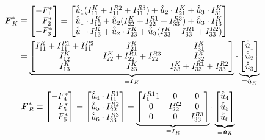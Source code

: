 \begin{equation}
\begin{split}
\boldsymbol{F}^*_K &\equiv \begin{bmatrix}-F^*_1 \\ -F^*_2 \\ -F^*_3\end{bmatrix} = 
\begin{bmatrix}
\hat{\dot{u}}_1(I^K_{11}+I^{R2}_{11}+I^{R3}_{11}) + \hat{\dot{u}}_2\cdot I^{K}_{21} + \hat{\dot{u}}_3\cdot I^{K}_{31}
\\
\hat{\dot{u}}_1\cdot I^{K}_{12} + \hat{\dot{u}}_2(I^{K}_{22}+I^{R1}_{22}+I^{R3}_{33}) + \hat{\dot{u}}_3\cdot I^{K}_{13} 
\\
\hat{\dot{u}}_1\cdot I^{K}_{13} + \hat{\dot{u}}_2\cdot I^{K}_{23} + \hat{\dot{u}}_3(I^{K}_{33}+I^{R1}_{33}+I^{R2}_{33})
\end{bmatrix} \\
&= 
\underbrace{
\begin{bmatrix}
I^K_{11}+I^{R1}_{11}+I^{R2}_{11} & I^K_{21} & I^K_{31} \\
I^K_{12} & I^K_{22}+I^{R1}_{22}+I^{R3}_{22} & I^K_{32} \\
I^K_{13} & I^K_{23} & I^K_{33}+I^{R1}_{33}+I^{R2}_{33}
\end{bmatrix}}_{\equiv \boldsymbol{I}_K} \cdot \underbrace{\begin{bmatrix}
\hat{\dot{u}}_1 \\ \hat{\dot{u}}_2 \\ \hat{\dot{u}}_3
\end{bmatrix}}_{\equiv \boldsymbol{\dot{u}}_K}
\end{split}
\end{equation} 
\begin{equation}
\begin{split}
\boldsymbol{F}^*_R &\equiv \begin{bmatrix}-F^*_4 \\ -F^*_5 \\ -F^*_6 \end{bmatrix} = 
\begin{bmatrix}
\hat{\dot{u}}_4 \cdot I^{R1}_{11} \\ \hat{\dot{u}}_5\cdot I^{R2}_{22} \\ \hat{\dot{u}}_6\cdot I^{R3}_{33}
\end{bmatrix} = \underbrace{\begin{bmatrix}
I^{R1}_11 & 0 & 0 \\ 0 & I^{R2}_{22} & 0 \\ 0 & 0 & I^{R3}_{33}
\end{bmatrix}}_{\equiv \boldsymbol{I}_R} \cdot \underbrace{\begin{bmatrix}
\hat{\dot{u}}_4 \\ \hat{\dot{u}}_5 \\ \hat{\dot{u}}_6
\end{bmatrix}}_{\equiv \boldsymbol{\dot{u}}_R}
\end{split}
\end{equation}
